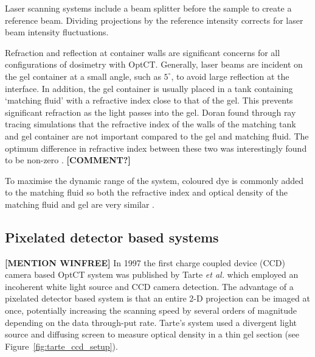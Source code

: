 \documentclass[12pt]{article}
\begin{document}
Laser scanning systems include a  beam splitter before the sample to create a reference beam. Dividing projections by the reference intensity  corrects for laser beam intensity fluctuations. \cite{Gore:1999tg}

Refraction and reflection at container walls are significant concerns for all configurations of dosimetry with OptCT. Generally, laser beams are incident on the gel container at a small angle, such as $5^{\circ}$, to avoid large reflection at the interface. In addition, the gel container is usually placed in a tank containing `matching fluid' with a refractive index close to that of the gel. This prevents significant refraction as the light passes into the gel. Doran found through ray tracing simulations that the refractive index of the walls of the matching tank and  gel container are not important compared to the gel and matching fluid. The optimum difference in refractive index between these two was interestingly found to be non-zero \cite{Doran:2001ee}. \textbf{[COMMENT?]}

To maximise the dynamic range of the system, coloured dye is commonly added to the matching fluid so both the refractive index and optical density of the matching fluid and gel are very similar \cite{Krstajic:2006kna}. 




\subsection{Pixelated detector based systems}
\textbf{[MENTION WINFREE]}
In 1997 the first charge coupled device (CCD) camera based OptCT system was published by Tarte \textit{et al.} which employed an incoherent white light source and CCD camera detection. \cite{Tarte:2007} The advantage  of a pixelated detector based system  is that an entire 2-D projection can be imaged at once, potentially increasing the scanning speed by several  orders of magnitude depending on the data through-put rate. Tarte's system used a divergent light source and diffusing screen to measure optical density in a thin gel section (see Figure~\ref{fig:tarte_ccd_setup}). 
\end{document}
